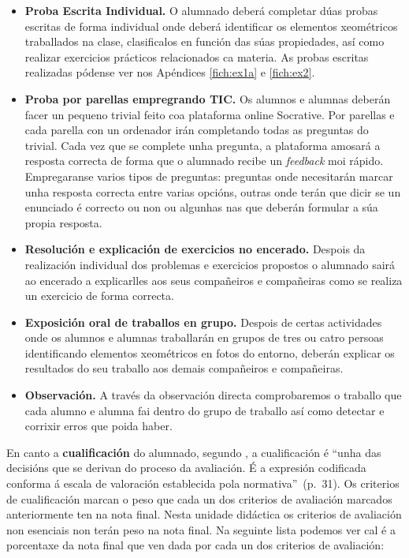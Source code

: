\begin{itemize}
    \item \textbf{Proba Escrita Individual.} O alumnado deberá completar dúas probas escritas de forma individual onde deberá identificar os elementos xeométricos traballados na clase, clasificalos en función das súas propiedades, así como realizar exercicios prácticos relacionados ca materia. As probas escritas realizadas pódense ver nos Apéndices \ref{fich:ex1a} e \ref{fich:ex2}.
    \item \textbf{Proba por parellas empregrando TIC.} Os alumnos e alumnas deberán facer un pequeno trivial feito coa plataforma online Socrative. Por parellas e cada parella con un ordenador irán completando todas as preguntas do trivial. Cada vez que se complete unha pregunta, a plataforma amosará a resposta correcta de forma que o alumnado recibe un \emph{feedback} moi rápido. Empregaranse varios tipos de preguntas: preguntas onde necesitarán marcar unha resposta correcta entre varias opcións, outras onde terán que dicir se un enunciado é correcto ou non ou algunhas nas que deberán formular a súa propia resposta.
    \item \textbf{Resolución e explicación de exercicios no encerado.} Despois da realización individual dos problemas e exercicios propostos o alumnado sairá ao encerado a explicarlles aos seus compañeiros e compañeiras como se realiza un exercicio de forma correcta.
    \item \textbf{Exposición oral de traballos en grupo.} Despois de certas actividades onde os alumnos e alumnas traballarán en grupos de tres ou catro persoas identificando elementos xeométricos en fotos do entorno, deberán explicar os resultados do seu traballo aos demais compañeiros e compañeiras.
    \item \textbf{Observación.} A través da observación directa comprobaremos o traballo que cada alumno e alumna fai dentro do grupo de traballo así como detectar e corrixir erros que poida haber.
\end{itemize}

En canto a \textbf{cualificación} do alumnado, segundo , a cualificación é ``unha das decisións que se derivan do proceso da avaliación. É a expresión codificada conforma á escala de valoración establecida pola normativa''~(p.~31). Os criterios de cualificación marcan o peso que cada un dos criterios de avaliación marcados anteriormente ten na nota final. Nesta unidade didáctica os criterios de avaliación non esenciais non terán peso na nota final. Na seguinte lista podemos ver cal é a porcentaxe da nota final que ven dada por cada un dos criterios de avaliación:


